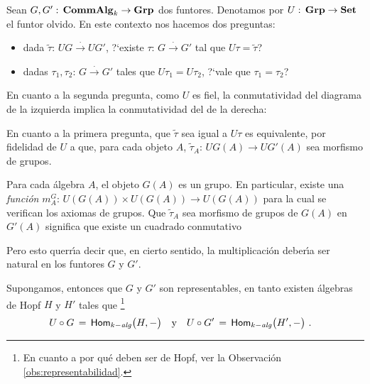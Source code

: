 Sean $G,G':\,\CommAlg[k]\rightarrow\Grp$ dos funtores. Denotamos por
$U:\,\Grp\rightarrow\Set$ el funtor olvido. En este contexto nos hacemos dos
preguntas:
\begin{itemize}
	\item dada $\tilde\tau:\,UG\xrightarrow\cdot UG'$, ?`existe
		$\tau:\,G\xrightarrow\cdot G'$ tal que $U\tau=\tilde\tau$?
	\item dadas $\tau_1,\tau_2:\,G\xrightarrow\cdot G'$ tales que
		$U\tau_1=U\tau_2$, ?`vale que $\tau_1=\tau_2$?
\end{itemize}
%
En cuanto a la segunda pregunta, como $U$ es fiel, la conmutatividad del
diagrama de la izquierda implica la conmutatividad del de la derecha:
\begin{center}
\end{center}
En cuanto a la primera pregunta, que $\tilde\tau$ sea igual a $U\tau$ es
equivalente, por fidelidad de $U$ a que, para cada objeto $A$,
$\tilde\tau_A:\,UG(A)\rightarrow UG'(A)$ sea morfismo de grupos.

Para cada \'{a}lgebra $A$, el objeto $G(A)$ es un grupo. En particular, existe
una \emph{funci\'{o}n} $m_A^G:\,U(G(A))\times U(G(A))\rightarrow U(G(A))$ para
la cual se verifican los axiomas de grupos. Que $\tilde\tau_A$ sea morfismo de
grupos de $G(A)$ en $G'(A)$ significa que existe un cuadrado conmutativo
\begin{center}
\end{center}
Pero esto querr\'{\i}a decir que, en cierto sentido, la multiplicaci\'{o}n
deber\'{\i}a ser natural en los funtores $G$ y $G'$.

Supongamos, entonces que $G$ y $G'$ son representables, en tanto existen
\'{a}lgebras de Hopf $H$ y $H'$ tales que%
\footnote{
	En cuanto a por qu\'{e} deben ser de Hopf, ver la Observaci\'{o}n~%
	\ref{obs:representabilidad}.
	}
\begin{align*}
	U\circ G \,=\,\Homalg\big(H,-\big) & \quad\text{y}\quad
	U\circ G' \,=\,\Homalg\big(H',-\big)
	\text{ .}
\end{align*}
%

